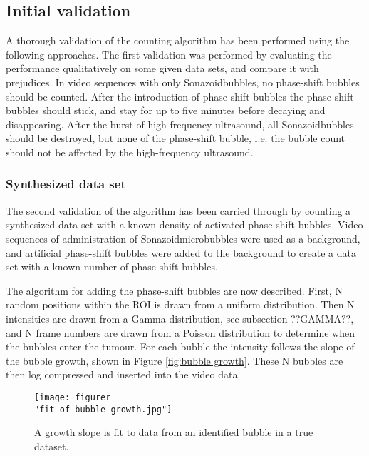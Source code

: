 \subsection{Initial validation}
A thorough validation of the counting algorithm has been performed using the following approaches. The first validation was performed by evaluating the performance qualitatively on some given data sets, and compare it with prejudices. In video sequences with only Sonazoid\texttrademark bubbles, no phase-shift bubbles should be counted. After the introduction of phase-shift bubbles the phase-shift bubbles should stick, and stay for up to five minutes before decaying and disappearing. After the burst of high-frequency ultrasound, all Sonazoid\texttrademark bubbles should be destroyed, but none of the phase-shift bubble, i.e. the bubble count should not be affected by the high-frequency ultrasound. 

 
\subsubsection{Synthesized data set}
The second validation of the algorithm has been carried through by counting a synthesized data set with a known density of activated phase-shift bubbles. Video sequences of administration of Sonazoid\texttrademark microbubbles were used as a background, and artificial phase-shift bubbles were added to the background to create a data set with a known number of phase-shift bubbles.

The algorithm for adding the phase-shift bubbles are now described. First, N random positions within the ROI is drawn from a uniform distribution. Then N intensities are drawn from a Gamma distribution, see subsection ??GAMMA??, and N frame numbers are drawn from a Poisson distribution to determine when the bubbles enter the tumour. For each bubble the intensity follows the slope of the bubble growth, shown in Figure \ref{fig:bubble growth}. These N bubbles are then log compressed and inserted into the video data. 


\begin{figure}[h]
  \centering
  \label{Fig:Sonazoid}
  \texttt{[image: figurer\\"fit of bubble growth.jpg"]}
  \caption{A growth slope is fit to data from an identified bubble in a true dataset.}
\end{figure}


